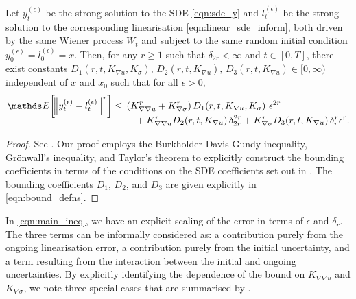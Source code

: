\begin{theorem}\label{thm:main}
	Let \(y_t^{(\epsilon)}\) be the strong solution to the SDE \cref{eqn:sde_y} and \(l_t^{(\epsilon)}\) be the strong solution to the corresponding linearisation \cref{eqn:linear_sde_inform}, both driven by the same Wiener process \(W_t\) and subject to the same random initial condition \(y_0^{(\epsilon)} = l_0^{(\epsilon)} = x\).
	Then, for any \(r \geq 1\) such that \(\delta_{2r} < \infty\) and \(t \in [0,T]\), there exist constants \( D_1\!\left(r,t, K_{\nabla u}, K_{\sigma}\right), \, D_2\!\left(r,t, K_{\nabla u}\right), \, D_3\!\left(r,t, K_{\nabla u}\right) \in [0, \infty) \) independent of \(x\) and \(x_0\) such that for all \(\epsilon > 0\),
	\begin{equation}
		\avg{\norm{y_t^{(\epsilon)} - l_t^{(\epsilon)}}^r} \leq \begin{multlined}[t]
			\left(K_{\nabla\nabla u}^r + K_{\nabla\sigma}^r\right) D_1\!\left(r,t, K_{\nabla u}, K_\sigma\right)\, \epsilon^{2r} \\
			+ K_{\nabla\nabla u}^r D_2\!\left(r,t, K_{\nabla u}\right)\delta_{2r}^{2r}
			+ K_{\nabla\sigma}^r D_3\!\left(r,t, K_{\nabla u}\right)\delta_r^r \epsilon^r.
		\end{multlined}
		\label{eqn:main_ineq}
	\end{equation}
\end{theorem}

\begin{proof}
	See .
	Our proof employs the Burkholder-Davis-Gundy inequality, Gr\"onwall's inequality, and Taylor's theorem to explicitly construct the bounding coefficients in terms of the conditions on the SDE coefficients set out in .
	The bounding coefficients \(D_1\), \(D_2\), and \(D_3\) are given explicitly in \cref{eqn:bound_defns}.
\end{proof}


In \cref{eqn:main_ineq}, we have an explicit scaling of the error in terms of \(\epsilon\) and \(\delta_r\).
The three terms can be informally considered as: a contribution purely from the ongoing linearisation error, a contribution purely from the initial uncertainty, and a term resulting from the interaction between the initial and ongoing uncertainties.
By explicitly identifying the dependence of the bound on \(K_{\nabla\nabla u}\) and \(K_{\nabla \sigma}\), we note three special cases that are summarised by .

